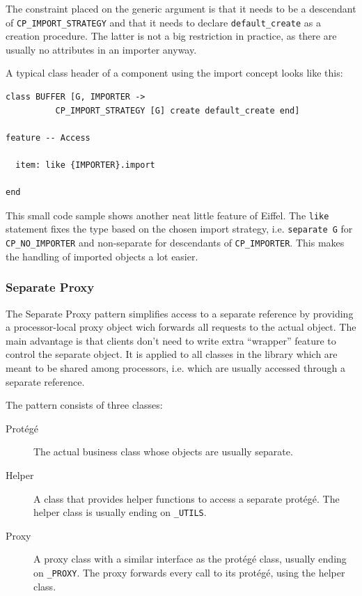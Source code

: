 The constraint placed on the generic argument is that it needs to be a descendant of \lstinline!CP_IMPORT_STRATEGY! and that it needs to declare \lstinline!default_create! as a creation procedure.
The latter is not a big restriction in practice, as there are usually no attributes in an importer anyway.

A typical class header of a component using the import concept looks like this:
\begin{lstlisting}[language=OOSC2Eiffel, captionpos=b, caption={An example component with import.}]
class BUFFER [G, IMPORTER -> 
          CP_IMPORT_STRATEGY [G] create default_create end]

feature -- Access

  item: like {IMPORTER}.import

end
\end{lstlisting}

This small code sample shows another neat little feature of Eiffel.
The \lstinline!like! statement fixes the type based on the chosen import strategy, i.e. \lstinline!separate G! for \lstinline!CP_NO_IMPORTER! and non-separate for descendants of \lstinline!CP_IMPORTER!.
This makes the handling of imported objects a lot easier.

\subsubsection{Separate Proxy}
\label{sec:separate-proxy}

The Separate Proxy pattern  simplifies access to a separate reference by providing a processor-local proxy object wich forwards all requests to the actual object.
The main advantage is that clients don't need to write extra ``wrapper'' feature to control the separate object.
It is applied to all classes in the library which are meant to be shared among processors, i.e. which are usually accessed through a separate reference.

The pattern consists of three classes:
\begin{description}
 \item [Protégé] The actual business class whose objects are usually separate.
 \item [Helper] A class that provides helper functions to access a separate protégé.
  The helper class is usually ending on \lstinline!_UTILS!.
 \item [Proxy] A proxy class with a similar interface as the protégé class, usually ending on \lstinline!_PROXY!.
    The proxy forwards every call to its protégé, using the helper class.
\end{description}

